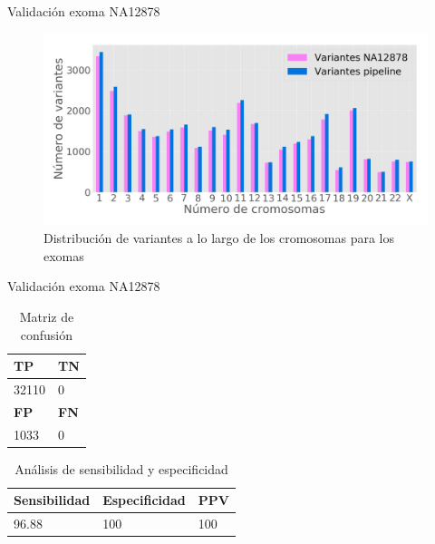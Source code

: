\documentclass[xcolor=dvipsnames]{beamer}
\begin{document}
\begin{frame}{Validación exoma NA12878}
\begin{figure}[H]
	\includegraphics[width=1\textwidth]{validacion2.png}
	\caption{Distribución de variantes a lo largo de los cromosomas para los exomas} \label{fig:tabla2}
\end{figure}
\end{frame}


\begin{frame}{Validación exoma NA12878}
    \begin{table}[H]
	    \begin{center}
		    \begin{tabular}{|l|l|}
			    \hline 
			    \textbf{TP} &  \textbf{TN} \\
			    \hline 
			    32110 & 0  \\ \hline
			    \textbf{FP} &  \textbf{FN} \\
			    \hline
			    1033 &  0\\ \hline
		    \end{tabular}
		\caption{Matriz de confusión}
		\label{tabla:tabla3}
	\end{center}
\end{table}


\begin{table}[H]
	\begin{center}
		\begin{tabular}{|l|l|l|}
			\hline 
			\textbf{Sensibilidad} & \textbf{Especificidad} & \textbf{PPV} \\
			\hline 
			96.88 & 100 & 100 \\ \hline
		\end{tabular}
		\caption{Análisis de sensibilidad y especificidad}
		\label{tabla:tabla4}
	\end{center}
\end{table}

\end{frame}
\end{document}
